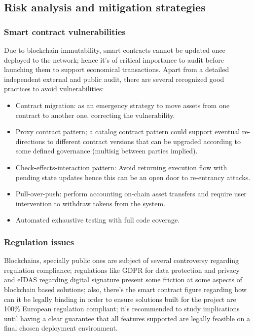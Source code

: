 \documentclass[12pt]{amsart}
\begin{document}
\begin{multicols}{2}


\subsection{Risk analysis and mitigation strategies}

\subsubsection{Smart contract vulnerabilities}

Due to blockchain immutability, smart contracts cannot be updated once
deployed to the network; hence it's of critical importance to audit
before launching them to support economical transactions. Apart from
a detailed independent external and public audit,
there are several recognized good practices to avoid
vulnerabilities:

\begin{itemize}
\item Contract migration: as an emergency strategy to move assets from
one contract to another one, correcting the vulnerability.
\item Proxy contract pattern; a catalog contract pattern could support eventual
re-directions to different contract versions that can be upgraded
according to some defined governance (multisig between parties implied).
\item Check-effects-interaction pattern: Avoid returning execution flow
with pending state updates hence this can be an open door
to re-entrancy attacks.
\item Pull-over-push: perform accounting on-chain asset transfers and require
user intervention to withdraw tokens from the system.
\item Automated exhaustive testing with full code coverage.
\end{itemize}


\subsubsection{Regulation issues}

Blockchains, specially public ones are subject of several controversy
regarding regulation compliance; regulations like GDPR for data protection
and privacy and eIDAS regarding digital signature present some friction
at some aspects of blockchain based solutions; also, there's the
smart contract figure regarding how can it be legally binding
in order to ensure solutions built
for the project are 100\% European regulation compliant;
it's recommended to study implications
until having a clear guarantee that all features supported are legally
feasible on a final chosen deployment environment.


\end{multicols}
\end{document}
